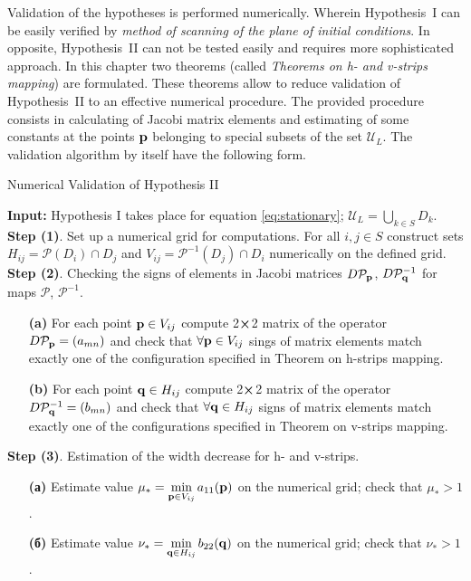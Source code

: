 \documentclass[candidate, href, colorlinks]{disser}
\begin{document}
Validation of the hypotheses is performed numerically.
Wherein Hypothesis~I can be easily verified by {\it method of scanning of the plane of initial conditions}.
In opposite, Hypothesis~II can not be tested easily and requires more sophisticated approach.
In this chapter two theorems (called {\it Theorems on h- and v-strips mapping}) are formulated.
These theorems allow to reduce validation of Hypothesis~II to an effective numerical procedure.
The provided procedure consists in calculating of Jacobi matrix elements and estimating of some constants at the points $\vb{p}$ belonging to special subsets of the set $\mathscr{U}_L$.
The validation algorithm by itself have the following form.

\begin{algorithm}[H]
\caption{Numerical Validation of Hypothesis II}
\label{algorithm:hypotheses-validation}
\begin{algorithmic}
	\STATE \textbf{Input:} Hypothesis I takes place for equation \eqref{eq:stationary}; $\mathscr{U}_L = \bigcup_{k \in S} D_k$.
	\STATE \textbf{Step (1)}. Set up a numerical grid for computations.
		For all $i, j \in S$ construct sets $H_{ij} = \mathcal{P}(D_i) \cap D_j$ and $V_{ij} = \mathcal{P}^{-1} (D_j) \cap D_i$ numerically on the defined grid.
	\STATE \textbf{Step (2)}. Checking the signs of elements in Jacobi matrices $D \mathcal{P}_{\vb{p}}$, $D \mathcal{P}_{\vb{q}}^{-1}$ for maps $\mathcal{P}$, $\mathcal{P}^{-1}$.
	\STATE
	\begin{enumerate}
		\setlength{\itemsep}{1pt}
		\setlength{\parskip}{0pt}
  		\setlength{\parsep}{0pt}
		\item[\textbf{(a)}] For each point $\vb{p} \in V_{ij}$ compute 2$\cross$2 matrix of the operator $D \mathcal{P}_{\vb{p}} = (a_{mn})$ and check that $\forall \vb{p} \in V_{ij}$ sings of matrix elements match exactly one of the configuration specified in Theorem on h-strips mapping.
		\item[\textbf{(b)}] For each point $\vb{q} \in H_{ij}$ compute 2$\cross$2 matrix of the operator $D \mathcal{P}_{\vb{q}}^{-1} = (b_{mn})$ and check that $\forall \vb{q} \in H_{ij}$ signs of matrix elements match exactly one of the configurations specified in Theorem on v-strips mapping.
	\end{enumerate}
	\STATE \textbf{Step (3)}. Estimation of the width decrease for h- and v-strips.
	\STATE
	\begin{enumerate}
		\setlength{\itemsep}{1pt}
		\setlength{\parskip}{0pt}
  		\setlength{\parsep}{0pt}
		\item[\textbf{(а)}] Estimate value $\mu_* = \min \limits_{\vb{p} \in V_{ij}} a_{11}(\vb{p})$ on the numerical grid; check that $\mu_* > 1$.
		\item[\textbf{(б)}] Estimate value $\nu_* = \min \limits_{\vb{q} \in H_{ij}} b_{22}(\vb{q})$ on the numerical grid; check that $\nu_* > 1$.
	\end{enumerate}
\end{algorithmic}
\end{algorithm}
\end{document}
